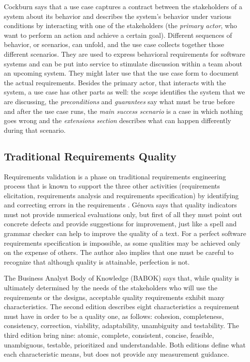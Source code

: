 Cockburn \cite{Cockburn_2000} says that a use case captures a contract between the stakeholders of a system about its behavior and describes the system’s behavior under various conditions by interacting with one of the stakeholders (the \textit{primary actor}, who want to perform an action and achieve a certain goal). Different sequences of behavior, or scenarios, can unfold, and the use case collects together those different scenarios. They are used to express behavioral requirements for software systems and can be put into service to stimulate discussion within a team about an upcoming system. They might later use that the use case form to document the actual requirements. Besides the primary actor, that interacts with the system, a use case has other parts as well: the \textit{scope} identifies the system that we are discussing, the \textit{preconditions} and \textit{guarantees} say what must be true before and after the use case runs, the \textit{main success scenario} is a case in which nothing goes wrong and the \textit{extensions section} describes what can happen differently during that scenario.

\subsection{Traditional Requirements Quality}

Requirements validation is a phase on traditional requirements engineering process that is known to support the three other activities (requirements elicitation, requirements analysis and requirements specification) by identifying and correcting errors in the requirements \cite{Heikkila_2015}. G{\'e}nova \cite{Genova_2013} says that quality indicators must not provide numerical evaluations only, but first of all they must point out concrete defects and provide suggestions for improvement, just like a spell and grammar checker can help to improve the quality of a text. For \cite{Davis_1993} a perfect software requirements specification is impossible, as some qualities may be achieved only on the expense of others. The author also implies that one must be careful to recognize that although quality is attainable, perfection is not.

The Business Analyst Body of Knowledge (BABOK) \cite{Babok_2015} says that, while quality is ultimately determined by the needs of the stakeholders who will use the requirements or the designs, acceptable quality requirements exhibit many characteristics. The second edition \cite{Babok_2009} describes eight characteristics a requirement must have in order to be a quality one, as follows: cohesion, completeness, consistency, correction, viability, adaptability, unambiguity and testability. The third edition \cite{Babok_2015} bring nine: atomic, complete, consistent, concise, feasible, unambiguous, testable, prioritized and understandable. Both editions \cite{Babok_2009} \cite{Babok_2015} define what each characteristic means, but does not provide any measurement guidance.


